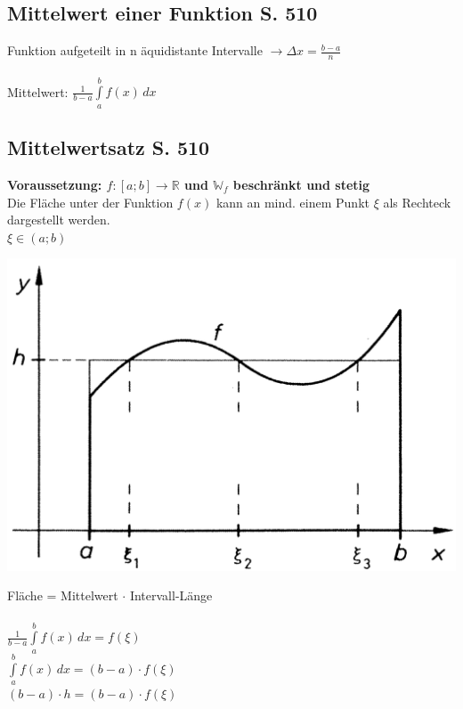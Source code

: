 		
		\subsection{Mittelwert einer Funktion S. 510}		
		Funktion aufgeteilt in n äquidistante Intervalle $\rightarrow \Delta x = \frac{b-a}{n}$ \\
		\\
		Mittelwert: \quad $\frac{1}{b-a} \int \limits_{a}^{b} f(x) \, dx$
		
		
		\subsection{Mittelwertsatz S. 510}
			\textbf{Voraussetzung: $f: [a;b] \rightarrow \mathbb{R}$ und $\mathbb{W}_f$ beschränkt und stetig} \\
		Die Fläche unter der Funktion $f(x)$ kann an mind. einem Punkt $\xi$ als Rechteck dargestellt werden. \\
		$\xi \in (a;b)$ \\
			
		\begin{minipage}{0.40\linewidth}
		\includegraphics[width=0.95\linewidth]{Bilder/MWS-integral} \\
		\end{minipage}
		\hfill				
		\begin{minipage}{0.55\linewidth}
		
		Fläche =  Mittelwert $\cdot$ Intervall-Länge \\
		\\ 
		 $\frac{1}{b-a} \int \limits_{a}^{b} f(x) \, dx = f(\xi)$ \\
		$ \int \limits_{a}^{b} f(x) \, dx = (b-a) \cdot f(\xi)$ \\
		$ (b-a) \cdot h = (b-a) \cdot f(\xi)$ \\
		\end{minipage}
		

